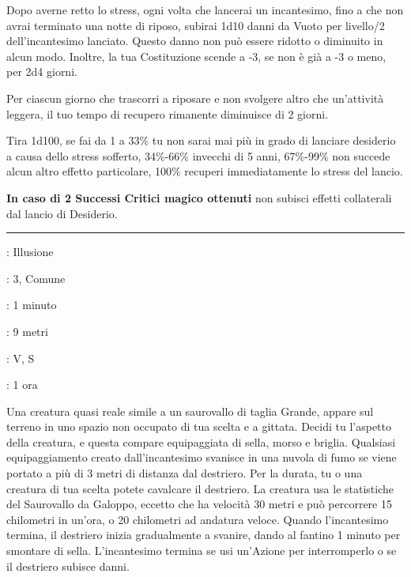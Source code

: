 \begin{multicols}{2}
Dopo averne retto lo stress, ogni volta che lancerai un incantesimo, fino a che non avrai terminato una notte di riposo, subirai 1d10 danni da Vuoto per livello/2 dell'incantesimo lanciato. Questo danno non può essere ridotto o diminuito in alcun modo. Inoltre, la tua Costituzione scende a -3, se non è già a -3 o meno, per 2d4 giorni.

Per ciascun giorno che trascorri a riposare e non svolgere altro che un'attività leggera, il tuo tempo di recupero rimanente diminuisce di 2 giorni.

Tira 1d100, se fai da 1 a 33\% tu non sarai mai più in grado di lanciare desiderio a causa dello stress sofferto, 34\%-66\% invecchi di 5 anni, 67\%-99\% non succede alcun altro effetto particolare, 100\% recuperi immediatamente lo stress del lancio.

\textbf{In caso di 2 Successi Critici magico ottenuti} non subisci effetti collaterali dal lancio di Desiderio.

\smallskip\noindent\rule{\linewidth}{2pt} \hypertarget{Destriero Fantasma}{}\medskip{}
\noindent
\begin{description}[noitemsep, topsep=0pt, parsep=0pt, partopsep=0pt, leftmargin=0cm, labelwidth=2.8cm]
	\item[\textbf{Lista di Magia}]: Illusione
	\item[\textbf{Livello}]: 3, Comune
	\item[\textbf{T. di Lancio}]: 1 minuto
	\item[\textbf{Gittata}]: 9 metri
	\item[\textbf{Componenti}]: V, S
	\item[\textbf{Durata}]: 1 ora
\end{description}

Una creatura quasi reale simile a un saurovallo di taglia Grande, appare sul terreno in uno spazio non occupato di tua scelta e a gittata. Decidi tu l'aspetto della creatura, e questa compare equipaggiata di sella, morso e briglia. Qualsiasi equipaggiamento creato dall'incantesimo svanisce in una nuvola di fumo se viene portato a più di 3 metri di distanza dal destriero. Per la durata, tu o una creatura di tua scelta potete cavalcare il destriero. La creatura usa le statistiche del Saurovallo da Galoppo, eccetto che ha velocità 30 metri e può percorrere 15 chilometri in un'ora, o 20 chilometri ad andatura veloce. Quando l'incantesimo termina, il destriero inizia gradualmente a svanire, dando al fantino 1 minuto per smontare di sella. L'incantesimo termina se usi un'Azione per interromperlo o se il destriero subisce danni.


\end{multicols}
